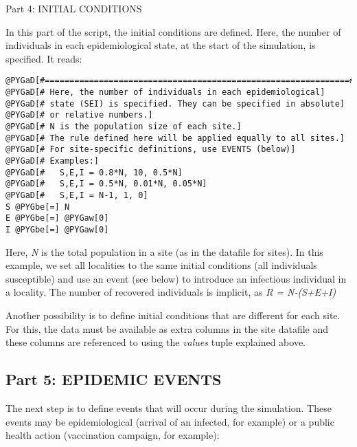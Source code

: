 \documentclass[a4paper,10pt]{manual}
\begin{document}
Part 4: INITIAL CONDITIONS

In this part of the script, the initial conditions are defined. Here, the number of individuals in each epidemiological state, at the start of the simulation, is specified. It reads:

\begin{Verbatim}[commandchars=@\[\]]
@PYGaD[#==============================================================#]
@PYGaD[# Here, the number of individuals in each epidemiological]
@PYGaD[# state (SEI) is specified. They can be specified in absolute]
@PYGaD[# or relative numbers.]
@PYGaD[# N is the population size of each site.]
@PYGaD[# The rule defined here will be applied equally to all sites.]
@PYGaD[# For site-specific definitions, use EVENTS (below)]
@PYGaD[# Examples:]
@PYGaD[#   S,E,I = 0.8*N, 10, 0.5*N]
@PYGaD[#   S,E,I = 0.5*N, 0.01*N, 0.05*N]
@PYGaD[#   S,E,I = N-1, 1, 0]
S @PYGbe[=] N
E @PYGbe[=] @PYGaw[0]
I @PYGbe[=] @PYGaw[0]
\end{Verbatim}

Here, \emph{N} is the total population in a site (as in the datafile for sites). In this example, we set all localities to the same initial conditions (all individuals susceptible) and use an event (see below) to introduce an infectious individual in a locality. The number of recovered individuals is implicit, as \emph{R = N-(S+E+I)}

Another possibility is to define initial conditions that are different for each site. For this, the data must be available as extra columns in the site datafile and these columns are referenced to using the \emph{values} tuple explained above.


\subsection{Part 5: EPIDEMIC EVENTS}

The next step is to define events that will occur during the simulation. These events may be epidemiological (arrival of an infected, for example) or a public health action (vaccination campaign, for example):
\end{document}
